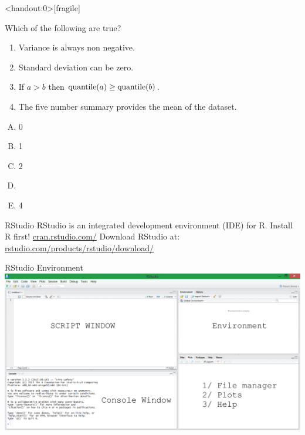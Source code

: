 \documentclass[xcolor=svgnames, 10pt]{beamer}
\begin{document}
\begin{frame}<handout:0>[fragile]
\begin{question}
Which of the following are true?
\begin{enumerate}
\item Variance is always non negative. \onslide<+->\pcmark
\item Standard deviation can be zero. \pcmark
\item If $a > b$ then ${\rm quantile}(a) \geq {\rm quantile}(b)$. \pcmark \label{27:743}
\item The five number summary provides the mean of the dataset. \pxmark
\end{enumerate}
\begin{multicols}{5}
\begin{enumerate}[A)]
\item 0
\item 1
\item 2
\item {}
\item 4
\end{enumerate}
\end{multicols}
\end{question}
\vfill
{}
\vfill
\end{frame}


\begin{frame}[fragile]{RStudio}
\vfill
RStudio is an integrated development environment (IDE) for R.
\vfill
Install R first! \url{cran.rstudio.com/}
\vfill
Download RStudio at: \url{rstudio.com/products/rstudio/download/}
\vfill
\end{frame}


\begin{frame}[fragile]{RStudio Environment}
\includegraphics[width=\textwidth]{images/RStudioWindow}
\end{frame}
\end{document}
